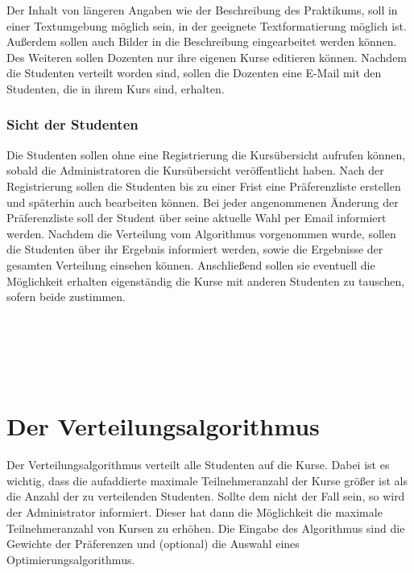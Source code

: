                 Der Inhalt von längeren Angaben wie der Beschreibung des Praktikums, soll in einer Textumgebung möglich sein, in der geeignete Textformatierung möglich ist.
                Außerdem sollen auch Bilder in die Beschreibung eingearbeitet werden können.
                Des Weiteren sollen Dozenten nur ihre eigenen Kurse editieren können.
                Nachdem die Studenten verteilt worden sind, sollen die Dozenten eine E-Mail mit den Studenten, die in ihrem Kurs sind, erhalten.
            
                
            \subsubsection{Sicht der Studenten}
                Die Studenten sollen ohne eine Registrierung die Kursübersicht aufrufen können, sobald die Administratoren die Kursübersicht veröffentlicht haben.
                Nach der Registrierung sollen die Studenten bis zu einer Frist eine Präferenzliste erstellen und späterhin auch bearbeiten können.
                Bei jeder angenommenen Änderung der Präferenzliste soll der Student über seine aktuelle Wahl per Email informiert werden.
                Nachdem die Verteilung vom Algorithmus vorgenommen wurde, sollen die Studenten über ihr Ergebnis informiert werden, sowie die Ergebnisse der gesamten Verteilung einsehen können.
                Anschließend sollen sie eventuell die Möglichkeit erhalten eigenständig die Kurse mit anderen Studenten zu tauschen, sofern beide zustimmen.
    
    
    	\\
    	\\
    	\\
    	\\
    
    
            
    
    \section{Der Verteilungsalgorithmus}
        Der Verteilungsalgorithmus verteilt alle Studenten auf die Kurse.
        Dabei ist es wichtig, dass die aufaddierte maximale Teilnehmeranzahl der Kurse größer ist als die Anzahl der zu verteilenden Studenten.
        Sollte dem nicht der Fall sein, so wird der Administrator informiert.
        Dieser hat dann die Möglichkeit die maximale Teilnehmeranzahl von Kursen zu erhöhen.
        Die Eingabe des Algorithmus sind die Gewichte der Präferenzen und (optional) die Auswahl eines Optimierungsalgorithmus.
        
